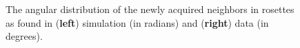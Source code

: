 \begin{figure}[H]
    \centering
    \caption{The angular distribution of the newly acquired neighbors in rosettes as found in (\textbf{left}) simulation (in radians) and (\textbf{right}) data (in degrees).}
    \label{fig:roestte-angle-dist}
    
\end{figure}


